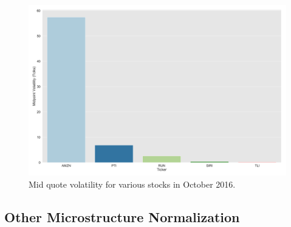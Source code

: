 	\begin{figure}[!ht]
	\centering
	\includegraphics[width=\textwidth]{chapters/chapter_trade_data_models/figures/mid_vol.png} 
	\caption{Mid quote volatility for various stocks in October 2016.\label{fig:mid_vol}}
	\end{figure}


\subsection{Other Microstructure Normalization\label{sec:other_micro_norm}}

